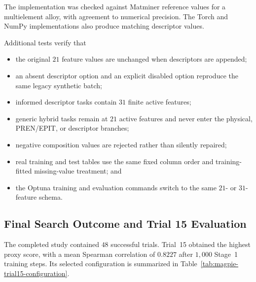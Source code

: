 \documentclass{article}
\begin{document}
The implementation was checked against Matminer reference values for a
multielement alloy, with agreement to numerical precision. The Torch and NumPy
implementations also produce matching descriptor values.

Additional tests verify that

\begin{itemize}
    \item the original \(21\) feature values are unchanged when descriptors are
    appended;
    \item an absent descriptor option and an explicit disabled option reproduce
    the same legacy synthetic batch;
    \item informed descriptor tasks contain \(31\) finite active features;
    \item generic hybrid tasks remain at \(21\) active features and never enter
    the physical, PREN/EPIT, or descriptor branches;
    \item negative composition values are rejected rather than silently
    repaired;
    \item real training and test tables use the same fixed column order and
    training-fitted missing-value treatment; and
    \item the Optuna training and evaluation commands switch to the same
    \(21\)- or \(31\)-feature schema.
\end{itemize}

\subsection{Final Search Outcome and Trial 15 Evaluation}
\label{sec:magpie-trial15-results}

The completed study contained \(48\) successful trials. Trial~15 obtained the
highest proxy score, with a mean Spearman correlation of \(0.8227\) after
\(1{,}000\) Stage~1 training steps. Its selected configuration is summarized in
Table~\ref{tab:magpie-trial15-configuration}.
\end{document}
